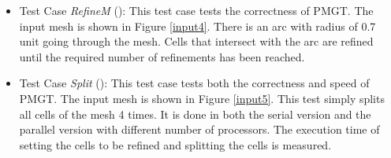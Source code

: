 \documentclass[12pt,titlepage]{article}
\begin{document}
\begin{itemize}
\item Test Case {\em RefineM} (\cthecasenum \label{ATCrm}): This test case tests the correctness of PMGT. The input mesh is shown in Figure \ref{input4}. There is an arc with radius of 0.7 unit going through the mesh. Cells that intersect with the arc are refined until the required number of refinements has been reached. 

\item Test Case {\em Split} (\cthecasenum \label{ATCss}): This test case tests both the correctness and speed of PMGT. The input mesh is shown in Figure \ref{input5}. This test simply splits all cells of the mesh 4 times. It is done in both the serial version and the parallel version with different number of processors. The execution time of setting the cells to be refined and splitting the cells is measured. 
\end{itemize}
\end{document}
